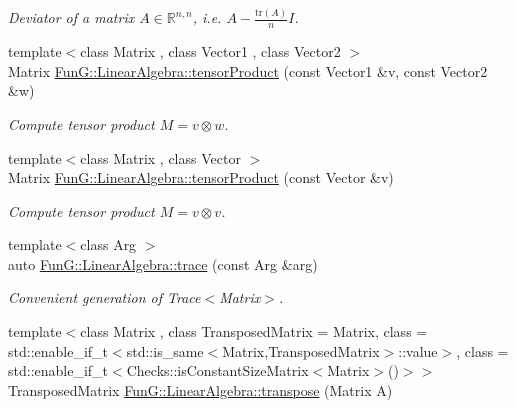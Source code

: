 \begin{DoxyCompactItemize}
\begin{DoxyCompactList}\small\item\em Deviator of a matrix $ A\in\mathbb{R}^{n,n} $, i.\-e. $ A - \frac{\mathrm{tr}(A)}{n}I $. \end{DoxyCompactList}\item 
\hypertarget{group__LinearAlgebraGroup_ga988c1ade64b8074baf2909752763ffab}{{\footnotesize template$<$class Matrix , class Vector1 , class Vector2 $>$ }\\Matrix \hyperlink{group__LinearAlgebraGroup_ga988c1ade64b8074baf2909752763ffab}{Fun\-G\-::\-Linear\-Algebra\-::tensor\-Product} (const Vector1 \&v, const Vector2 \&w)}\label{group__LinearAlgebraGroup_ga988c1ade64b8074baf2909752763ffab}

\begin{DoxyCompactList}\small\item\em Compute tensor product $ M = v \otimes w $. \end{DoxyCompactList}\item 
\hypertarget{group__LinearAlgebraGroup_gae5e82b9e66319511dae5ff0d9304a6b7}{{\footnotesize template$<$class Matrix , class Vector $>$ }\\Matrix \hyperlink{group__LinearAlgebraGroup_gae5e82b9e66319511dae5ff0d9304a6b7}{Fun\-G\-::\-Linear\-Algebra\-::tensor\-Product} (const Vector \&v)}\label{group__LinearAlgebraGroup_gae5e82b9e66319511dae5ff0d9304a6b7}

\begin{DoxyCompactList}\small\item\em Compute tensor product $ M = v \otimes v $. \end{DoxyCompactList}\item 
{\footnotesize template$<$class Arg $>$ }\\auto \hyperlink{group__LinearAlgebraGroup_gab27aad35cfe5b14f492d2f365595e47a}{Fun\-G\-::\-Linear\-Algebra\-::trace} (const Arg \&arg)
\begin{DoxyCompactList}\small\item\em Convenient generation of Trace$<$\-Matrix$>$. \end{DoxyCompactList}\item 
\hypertarget{group__LinearAlgebraGroup_gae1c4ce713b63bea3e96c49dc5c7845de}{{\footnotesize template$<$class Matrix , class Transposed\-Matrix  = Matrix, class  = std\-::enable\-\_\-if\-\_\-t$<$std\-::is\-\_\-same$<$\-Matrix,\-Transposed\-Matrix$>$\-::value$>$, class  = std\-::enable\-\_\-if\-\_\-t$<$\-Checks\-::is\-Constant\-Size\-Matrix$<$\-Matrix$>$()$>$$>$ }\\Transposed\-Matrix \hyperlink{group__LinearAlgebraGroup_gae1c4ce713b63bea3e96c49dc5c7845de}{Fun\-G\-::\-Linear\-Algebra\-::transpose} (Matrix A)}\label{group__LinearAlgebraGroup_gae1c4ce713b63bea3e96c49dc5c7845de}


\end{DoxyCompactItemize}
